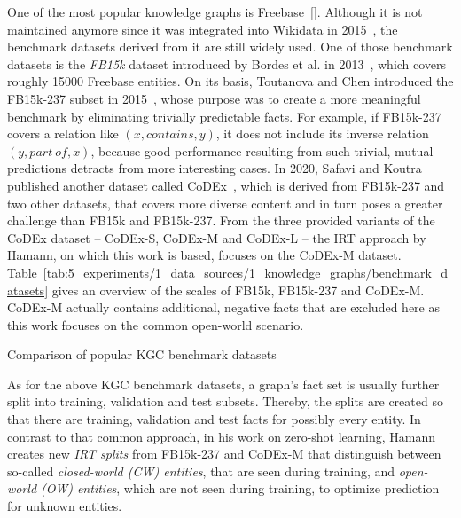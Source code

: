One of the most popular knowledge graphs is Freebase~\ref{}. Although it is not maintained anymore since it was integrated into Wikidata in 2015~\cite{Tanon2016FromFT}, the benchmark datasets derived from it are still widely used. One of those benchmark datasets is the \emph{FB15k} dataset introduced by Bordes et al. in 2013~\cite{Bordes2013TranslatingEF}, which covers roughly \num{15000} Freebase entities. On its basis, Toutanova and Chen introduced the FB15k-237 subset in 2015~\cite{Toutanova2015ObservedVL}, whose purpose was to create a more meaningful benchmark by eliminating trivially predictable facts. For example, if FB15k-237 covers a relation like $(x, contains, y)$, it does not include its inverse relation $(y, part~of, x)$, because good performance resulting from such trivial, mutual predictions detracts from more interesting cases. In 2020, Safavi and Koutra published another dataset called CoDEx~\cite{Safavi2020CoDExAC}, which is derived from FB15k-237 and two other datasets, that covers more diverse content and in turn poses a greater challenge than FB15k and FB15k-237. From the three provided variants of the CoDEx dataset -- CoDEx-S, CoDEx-M and CoDEx-L -- the IRT approach by Hamann, on which this work is based, focuses on the CoDEx-M dataset. Table~\ref{tab:5_experiments/1_data_sources/1_knowledge_graphs/benchmark_datasets} gives an overview of the scales of FB15k, FB15k-237 and CoDEx-M. CoDEx-M actually contains additional, negative facts that are excluded here as this work focuses on the common open-world scenario.

\begin{table}[h]
    \centering
    
    \caption{Comparison of popular KGC benchmark datasets}
    \label{tab:5_experiments/1_data_sources/1_knowledge_graphs/benchmark_datasets}
\end{table}

As for the above KGC benchmark datasets, a graph's fact set is usually further split into training, validation and test subsets. Thereby, the splits are created so that there are training, validation and test facts for possibly every entity. In contrast to that common approach, in his work on zero-shot learning, Hamann creates new \emph{IRT splits} from FB15k-237 and CoDEx-M that distinguish between so-called \emph{closed-world (CW) entities}, that are seen during training, and \emph{open-world (OW) entities}, which are not seen during training, to optimize prediction for unknown entities.

